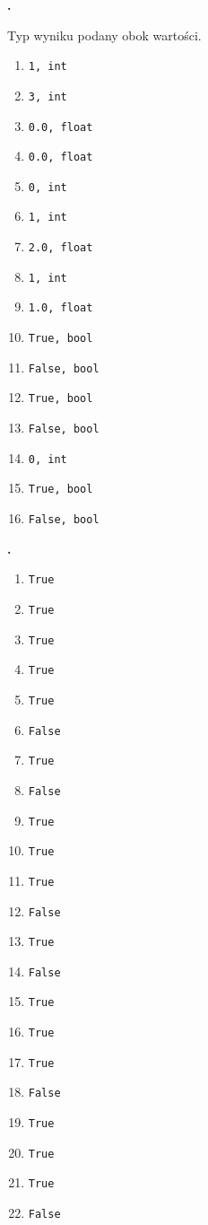 \documentclass[a4paper]{article}
\begin{document}
\textbf{.}\addtocounter{zadanie}{1} Typ wyniku podany obok wartości.

\begin{multicols}{2}
\begin{enumerate}[label=\arabic*.]
    \item \verb|1, int|
    \item \verb|3, int|
    \item \verb|0.0, float|
    \item \verb|0.0, float|
    \item \verb|0, int|
    \item \verb|1, int|
    \item \verb|2.0, float|
    \item \verb|1, int|
    \item \verb|1.0, float|
    \item \verb|True, bool|
    \item \verb|False, bool|
    \item \verb|True, bool|
    \item \verb|False, bool|
    \item \verb|0, int|
    \item \verb|True, bool|
    \item \verb|False, bool|

\end{enumerate}
\end{multicols}

\textbf{.}\addtocounter{zadanie}{1}

\begin{multicols}{2}
\begin{enumerate}[label=\arabic*.]
    \item \verb|True|
    \item \verb|True|
    \item \verb|True|
    \item \verb|True|
    \item \verb|True|
    \item \verb|False|
    \item \verb|True|
    \item \verb|False|
    \item \verb|True|
    \item \verb|True|
    \item \verb|True|
    \item \verb|False|
    \item \verb|True|
    \item \verb|False|
    \item \verb|True|
    \item \verb|True|
    \item \verb|True|
    \item \verb|False|
    \item \verb|True|
    \item \verb|True|
    \item \verb|True|
    \item \verb|False|
\end{enumerate}
\end{multicols}
\end{document}
